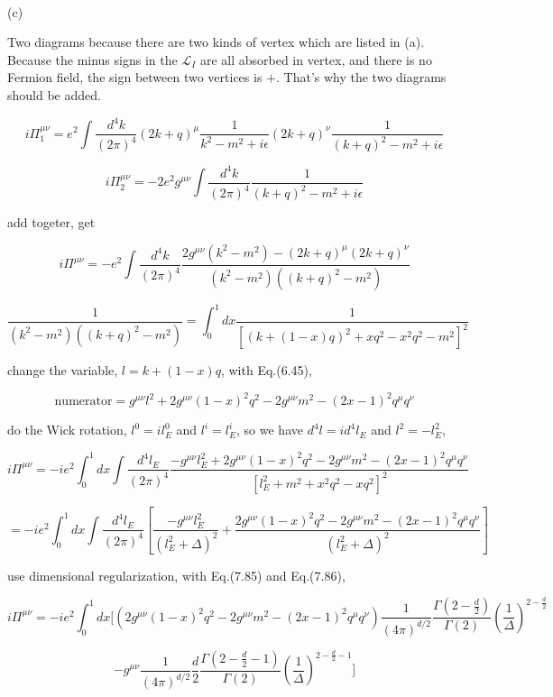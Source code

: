 \documentclass[prd,aps,nofootinbib,floatfix,10pt]{revtex4}
\newcommand{\blue}[1]{{\color{blue} #1}}
\begin{document}
~\\
\noindent (c)

Two diagrams because there are two kinds of vertex which are listed in (a). Because the minus signs in the $\mathcal{L}_I$ are all absorbed in vertex, and there is no Fermion field, the sign between two vertices is $+$. That's why the two diagrams should be added.


\[ i \Pi^{\mu \nu}_1 = e^2 \int \frac{d^4 k}{(2\pi)^4} (2k + q)^{\mu} \frac{1}{k^2 - m^2 + i \epsilon} (2k+q)^{\nu} \frac{1}{(k+q)^2 - m^2 + i \epsilon} \]

\[ i \Pi^{\mu \nu}_2 = - 2 e^2 g^{\mu \nu} \int \frac{d^4 k}{(2 \pi)^4} \frac{1}{(k+q)^2 - m^2 + i \epsilon} \]

add togeter, get

\[ i \Pi^{\mu \nu} = - e^2 \int \frac{d^4 k}{(2\pi)^4} \frac{2 g^{\mu \nu} (k^2 - m^2) - (2k + q)^{\mu} (2k+q)^{\nu}}{(k^2 - m^2)((k+q)^2 - m^2)} \]

\[ \frac{1}{(k^2 - m^2)((k+q)^2 - m^2)} = \int^1_0 dx \frac{1}{[(k + (1-x)q)^2 + xq^2 -x^2 q^2 - m^2]^2} \]

change the variable, $l = k + (1-x)q$, with \blue{Eq.(6.45)},

\[ \text{numerator} = g^{\mu \nu} l^2 + 2 g^{\mu \nu} (1-x)^2 q^2 - 2 g^{\mu \nu} m^2 - (2x-1)^2 q^\mu q^\nu \]

do the Wick rotation, $l^0 = i l^0_E$ and $l^i = l^i_E$, so we have $d^4 l = i d^4 l_E$ and $l^2 = - l^2_E$,

\[ i \Pi^{\mu \nu} = -i e^2 \int^1_0 dx \int \frac{d^4 l_E}{(2\pi)^4} \frac{-g^{\mu \nu} l_E^2 + 2 g^{\mu \nu} (1-x)^2 q^2 - 2 g^{\mu \nu} m^2 - (2x-1)^2 q^\mu q^\nu}{[l_E^2 + m^2 + x^2q^2 - xq^2]^2 } \]

\[= -i e^2 \int^1_0 dx \int \frac{d^4 l_E}{(2\pi)^4} [\frac{-g^{\mu \nu} l_E^2}{(l_E^2 + \Delta)^2} + \frac{2 g^{\mu \nu} (1-x)^2 q^2 - 2 g^{\mu \nu} m^2 - (2x-1)^2 q^\mu q^\nu}{(l_E^2 + \Delta)^2}] \]

use dimensional regularization, with \blue{Eq.(7.85) and Eq.(7.86)},

\[ i \Pi^{\mu \nu} = -i e^2 \int^1_0 dx [ (2 g^{\mu \nu} (1-x)^2 q^2 - 2 g^{\mu \nu} m^2 - (2x-1)^2 q^\mu q^\nu) \frac{1}{(4 \pi)^{d / 2}} \frac{\Gamma\left(2-\frac{d}{2}\right)}{\Gamma(2)}\left(\frac{1}{\Delta}\right)^{2-\frac{d}{2}} \]

\[ - g^{\mu \nu} \frac{1}{(4 \pi)^{d / 2}} \frac{d}{2} \frac{\Gamma\left(2-\frac{d}{2}-1\right)}{\Gamma(2)}\left(\frac{1}{\Delta}\right)^{2-\frac{d}{2}-1} ] \]
\end{document}
